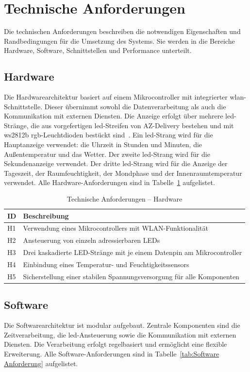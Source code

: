 \section{Technische Anforderungen}
Die technischen Anforderungen beschreiben die notwendigen Eigenschaften und Randbedingungen für die Umsetzung des Systems.
Sie werden in die Bereiche Hardware, Software, Schnittstellen und Performance unterteilt.

\subsection{Hardware}
Die Hardwarearchitektur basiert auf einem Mikrocontroller mit integrierter \gls{wlan}-Schnittstelle.
Dieser übernimmt sowohl die Datenverarbeitung als auch die Kommunikation mit externen Diensten.
Die Anzeige erfolgt über mehrere \gls{led}-Stränge, die aus vorgefertigen \gls{led}-Streifen von AZ-Delivery bestehen und mit \gls{ws2812b} \gls{rgb}-Leuchtdioden bestückt sind~\cite{AZDelivery}.
Ein \gls{led}-Strang wird für die Hauptanzeige verwendet: die Uhrzeit in Stunden und Minuten, die Außentemperatur und das Wetter.
Der zweite \gls{led}-Strang wird für die Sekundenanzeige verwendet.
Der dritte \gls{led}-Strang wird für die Anzeige der Tageszeit, der Raumfeuchtigkeit, der Mondphase und der Innenraumtemperatur verwendet.
Alle Hardware-Anforderungen sind in Tabelle~\ref{tab:Hardware Anforderung} aufgelistet.

\begin{table}[H]
\caption{Technische Anforderungen – Hardware}
\centering
\begin{tabular}{p{0.5cm} p{12.5cm}}
\textbf{ID} & \textbf{Beschreibung} \\
\hline
H1 & Verwendung eines Mikrocontrollers mit WLAN-Funktionalität \\
H2 & Ansteuerung von einzeln adressierbaren LEDs \\
H3 & Drei kaskadierte LED-Stränge mit je einem Datenpin am Mikrocontroller \\
H4 & Einbindung eines Temperatur- und Feuchtigkeitssensors \\
H5 & Sicherstellung einer stabilen Spannungsversorgung für alle Komponenten \\
\end{tabular}
\label{tab:Hardware Anforderung}
\end{table}

\subsection{Software}
Die Softwarearchitektur ist modular aufgebaut.
Zentrale Komponenten sind die Zeitverarbeitung, die \gls{led}-Ansteuerung sowie die Kommunikation mit externen Diensten.
Die Verarbeitung erfolgt regelbasiert und ermöglicht eine flexible Erweiterung.
Alle Software-Anforderungen sind in Tabelle~\ref{tab:Software Anforderung} aufgelistet.

